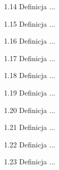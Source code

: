 \begin{enumerate}
    \item [1.14] Definicja ... %
    \item [1.15] Definicja ... %
    \item [1.16] Definicja ... %
    \item [1.17] Definicja ... %
    \item [1.18] Definicja ... %
    \item [1.19] Definicja ... %
    \item [1.20] Definicja ... %
    \item [1.21] Definicja ... %
    \item [1.22] Definicja ... %
    \item [1.23] Definicja ... %
\end{enumerate}	
	
